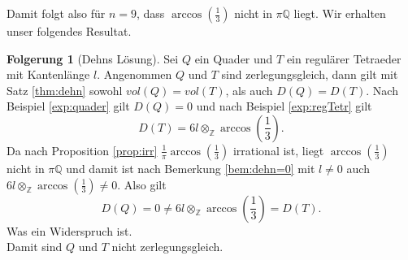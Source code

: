 \documentclass[11pt,titlepage]{article}
\newcommand{\setZ}{\mathbb{Z}}
\newcommand{\setQ}{\mathbb{Q}}
\theoremstyle{definition}
\newtheorem{corollary}[theorem]{Folgerung}
\newtheorem{definition}[theorem]{Definition}
\newtheorem{remark}[theorem]{Bemerkung}
\theoremstyle{remark}
\begin{document}
	Damit folgt also für $n=9$, dass $\arccos\left(\frac{1}{3}\right)$ nicht in $\pi\setQ$ liegt. Wir erhalten unser 
	folgendes Resultat.
	
	\begin{corollary}[Dehns Lösung]
		Sei $Q$ ein Quader und $T$ ein regulärer Tetraeder mit Kantenlänge $l$. Angenommen 
		$Q$ und $T$ sind zerlegungsgleich, dann gilt mit Satz \ref{thm:dehn} sowohl $vol(Q)=vol(T)$, als auch 
		$D(Q)=D(T)$. 
		Nach Beispiel \ref{exp:quader} gilt $D(Q)=0$ und nach Beispiel \ref{exp:regTetr} gilt
		\[D(T)=6l\otimes_{\setZ}\arccos\left(\frac{1}{3}\right).\]
		Da nach Proposition \ref{prop:irr} $\frac{1}{\pi}\arccos\left(\frac{1}{3}\right)$ irrational ist, liegt
		$\arccos\left(\frac{1}{3}\right)$ nicht in $\pi\setQ$ und damit ist nach Bemerkung \ref{bem:dehn=0} 
		mit $l\neq 0$ auch $6l\otimes_{\setZ}\arccos\left(\frac{1}{3}\right)\neq 0$. Also gilt
		\[ D(Q)=0\neq 6l\otimes_{\setZ}\arccos\left(\frac{1}{3}\right)=D(T).\]
		Was ein Widerspruch ist. \\
		Damit sind $Q$ und $T$ nicht zerlegungsgleich.
	\end{corollary}	
\end{document}
